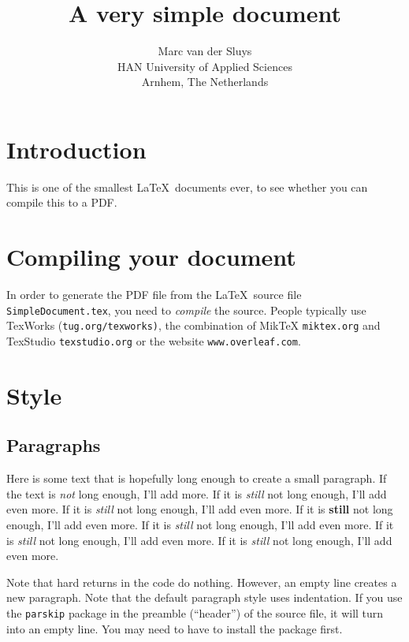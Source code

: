 \documentclass[11pt]{article}
\title{A very simple document}
\author{Marc van der Sluys\\
HAN University of Applied Sciences\\
Arnhem, The Netherlands}
\begin{document}
\maketitle

\tableofcontents


\section{Introduction}

This is one of the smallest \LaTeX\ documents ever, to see whether you can compile this to a PDF.  

\section{Compiling your document}

In order to generate the PDF file from the \LaTeX\ source file \texttt{SimpleDocument.tex}, you need to
\emph{compile} the source.  People typically use TexWorks (\texttt{tug.org/texworks)}, the combination of
MikTeX \texttt{miktex.org} and TexStudio \texttt{texstudio.org} or the website \texttt{www.overleaf.com}.

\section{Style}

\subsection{Paragraphs}

Here is some text that is hopefully long enough to create a small paragraph.  If the text is \emph{not} long
enough, I'll add more.
If it is \emph{still} not long enough, I'll add even more.
If it is \emph{still} not long enough, I'll add even more.
If it is \textbf{still} not long enough, I'll add even more.
If it is \emph{still} not long enough, I'll add even more.
If it is \emph{still} not long enough, I'll add even more.
If it is \emph{still} not long enough, I'll add even more.

Note that hard returns in the code do nothing.  However, an empty line creates a new paragraph.  Note that the
default paragraph style uses indentation.  If you use the \texttt{parskip} package in the preamble
(``header'') of the source file, it will turn into an empty line.  You may need to have to install the package
first.
\end{document}
